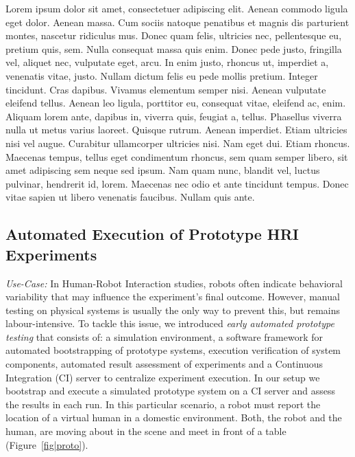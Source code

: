 \documentclass[conference]{IEEEtran}
\begin{document}
Lorem ipsum dolor sit amet, consectetuer adipiscing elit. Aenean commodo ligula
eget dolor. Aenean massa. Cum sociis natoque penatibus et magnis dis parturient
montes, nascetur ridiculus mus. Donec quam felis, ultricies nec, pellentesque
eu, pretium quis, sem. Nulla consequat massa quis enim. Donec pede justo,
fringilla vel, aliquet nec, vulputate eget, arcu. In enim justo, rhoncus ut,
imperdiet a, venenatis vitae, justo. Nullam dictum felis eu pede mollis pretium.
Integer tincidunt. Cras dapibus. Vivamus elementum semper nisi. Aenean vulputate
eleifend tellus. Aenean leo ligula, porttitor eu, consequat vitae, eleifend ac,
enim. Aliquam lorem ante, dapibus in, viverra quis, feugiat a, tellus. Phasellus
viverra nulla ut metus varius laoreet. Quisque rutrum. Aenean imperdiet. Etiam
ultricies nisi vel augue. Curabitur ullamcorper ultricies nisi. Nam eget dui.
Etiam rhoncus. Maecenas tempus, tellus eget condimentum rhoncus, sem quam semper
libero, sit amet adipiscing sem neque sed ipsum. Nam quam nunc, blandit vel,
luctus pulvinar, hendrerit id, lorem. Maecenas nec odio et ante tincidunt
tempus. Donec vitae sapien ut libero venenatis faucibus. Nullam quis ante. 

\subsection{Automated Execution of Prototype HRI Experiments}
\label{scenario1}

\emph{Use-Case:} In Human-Robot Interaction studies, robots often indicate
behavioral variability that may influence the experiment's final outcome.
However, manual testing on physical systems is usually the only way to prevent
this, but remains labour-intensive. To tackle this issue, we introduced
\emph{early automated prototype testing} \cite{2645922} that consists of: a
simulation environment, a software framework for automated bootstrapping of
prototype systems, execution verification of system components, automated result
assessment of experiments \cite{2563606} and a Continuous Integration (CI)
\cite{duvall2007continuous} server to centralize experiment execution. In our
setup we bootstrap and execute a simulated prototype system on a CI server and
assess the results in each run. In this particular scenario, a robot must report
the location of a virtual human in a domestic environment. Both, the robot and
the human, are moving about in the scene and meet in front of a table
(Figure~\ref{fig|proto}).
\end{document}

